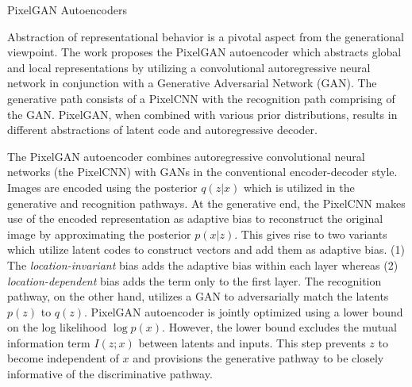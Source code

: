 \documentclass[11pt,letterpaper]{article}
\begin{document}
\begin{center}
  \large{PixelGAN Autoencoders}
\end{center}

Abstraction of representational behavior is a pivotal aspect from the generational viewpoint. The work proposes the PixelGAN autoencoder which abstracts global and local representations by utilizing a convolutional autoregressive neural network in conjunction with a Generative Adversarial Network (GAN). The generative path consists of a PixelCNN with the recognition path comprising of the GAN. PixelGAN, when combined with various prior distributions, results in different abstractions of latent code and autoregressive decoder. 

The PixelGAN autoencoder combines autoregressive convolutional neural networks (the PixelCNN) with GANs in the conventional encoder-decoder style. Images are encoded using the posterior $q(z|x)$ which is utilized in the generative and recognition pathways. At the generative end, the PixelCNN makes use of the encoded representation as adaptive bias to reconstruct the original image by approximating the posterior $p(x|z)$. This gives rise to two variants which utilize latent codes to construct vectors and add them as adaptive bias. (1) The \textit{location-invariant} bias adds the adaptive bias within each layer whereas (2) \textit{location-dependent} bias adds the term only to the first layer. The recognition pathway, on the other hand, utilizes a GAN to adversarially match the latents $p(z)$ to $q(z)$. PixelGAN autoencoder is jointly optimized using a lower bound on the log likelihood $\log p(x)$. However, the lower bound excludes the mutual information term $I(z;x)$ between latents and inputs. This step prevents $z$ to become independent of $x$ and provisions the generative pathway to be closely informative of the discriminative pathway. 
\end{document}
